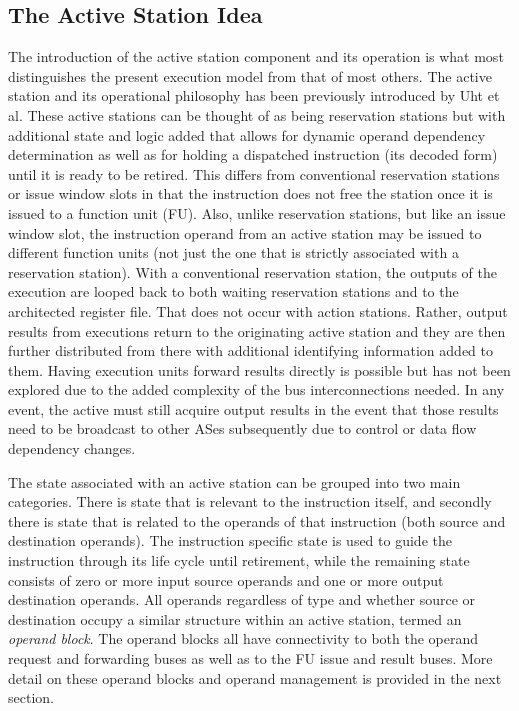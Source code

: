 \documentclass{book}
\begin{document}
\subsection{The Active Station Idea}
%
The introduction of the active station component and its operation is what
most distinguishes the present execution model from that of most others.
The active station and its operational philosophy
has been previously introduced by
Uht et al. \cite{uht02realizing}
These active stations can be thought of as being 
reservation stations \cite{Tom67} but
with additional state and logic added that allows
for dynamic operand dependency determination as well as
for holding a dispatched instruction (its decoded form) 
until it is ready to be
retired.  This differs from conventional reservation stations
or issue window slots in that the instruction does not free
the station once it is issued to a function unit (FU).
Also, unlike reservation stations, but like an issue window slot,
the instruction operand from an active station may be issued
to different function units (not just the one that is strictly
associated with a reservation station).
With a conventional reservation station, the outputs of the execution
are looped back to both waiting reservation stations and to the
architected register file.  That does not occur with action stations.
Rather, output results from executions return to the originating
active station and they are then further distributed from there
with additional identifying information added to them.
Having execution units forward results directly is possible but
has not been explored due to the added complexity of the bus
interconnections needed.  In any event, the active must still
acquire output results in the event that those results need
to be broadcast to other ASes subsequently due to control or
data flow dependency changes.

The state associated with an active station can be grouped into
two main categories.  There is state that is relevant to
the instruction itself, and secondly there is state that is
related to the operands of that instruction (both source and
destination operands).
The instruction specific state is used to guide the instruction
through its life cycle until retirement, while the remaining
state consists of zero or more input
source operands and one or more output destination operands.
All operands regardless of type and whether source or destination
occupy a similar structure within an active station, termed an
\textit{operand block}.
The operand blocks all have connectivity to both the
operand request and forwarding buses as well as to the FU
issue and result buses.
More detail on these operand blocks and operand management
is provided in the next section.
\end{document}
